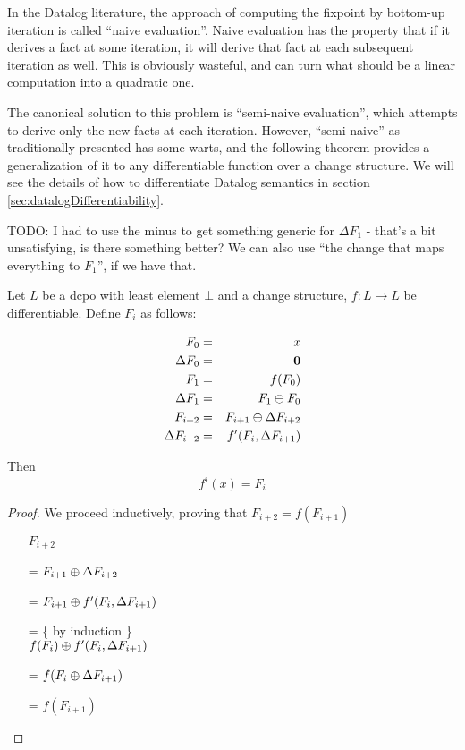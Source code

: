 In the Datalog literature, the approach of computing the fixpoint by bottom-up
iteration is called ``naive evaluation''. Naive evaluation has the property that
if it derives a fact at some iteration, it will derive that fact at each
subsequent iteration as well. This is obviously wasteful, and can turn what
should be a linear computation into a quadratic one.

The canonical solution to this problem is ``semi-naive evaluation'', which
attempts to derive only the new facts at each iteration. However, ``semi-naive''
as traditionally presented has some warts, and
the following theorem provides a generalization of it to any differentiable function over a
change structure. We will see the details of how to differentiate Datalog
semantics in section \ref{sec:datalogDifferentiability}.

TODO: I had to use the minus to get something generic for $\Delta F_1$ - that's
a bit unsatisfying, is there something better? We can also use ``the change that
maps everything to $F_1$'', if we have that.

\begin{thm}
\label{thm:diffIter}
  Let $L$ be a dcpo with least element $\bot$ and a change structure, $f: L \rightarrow L$ be
  differentiable. Define $F_i$ as follows:

  \begin{eqnarray*}
  F_0 & = & x\\
  \Delta F_0 & = & \textbf{0} \\
  F_1 & = & f(F_0)\\
  \Delta F_1 & = & F_1 \ominus F_0 \\
  F_{i+2} & = & F_{i+1} \oplus \Delta F_{i+2} \\
  \Delta F_{i+2} & = & f'(F_i, \Delta F_{i+1}) \\
  \end{eqnarray*}

  Then 
  $$f^i(x) = F_i$$
\end{thm}

\begin{proof}
We proceed inductively, proving that $F_{i+2} = f(F_{i+1})$

\begin{itemize}
\item[ ]$F_{i+2}$
\item[=]
$
F_{i+1} \oplus \Delta F_{i+2}
$
\item[=]
$
F_{i+1} \oplus f'( F_i, \Delta F_{i+1})
$
\item[=] \{ by induction \}\\
$
f(F_i) \oplus f'(F_i, \Delta F_{i+1})
$
\item[=]
$
f(F_i \oplus \Delta F_{i+1})
$ 
\item[=]
$f(F_{i+1})$
\end{itemize}
\end{proof}

